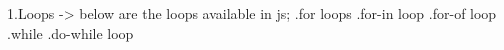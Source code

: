 1.Loops ->
below are  the loops available in js;
.for loops
.for-in loop
.for-of loop
.while
.do-while loop
